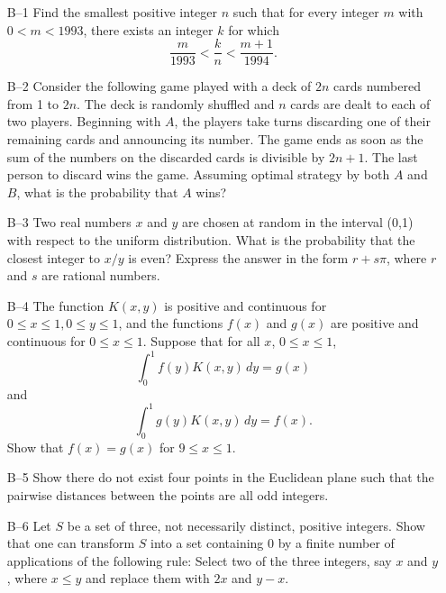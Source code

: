 \documentclass[amssymb,twocolumn,pra,10pt,aps]{revtex4-1}
\begin{document}
\begin{itemize}
\item[B--1]
Find the smallest positive integer $n$ such that for every integer $m$
with $0 < m < 1993$, there exists an integer $k$ for which
\[
\frac{m}{1993} < \frac{k}{n} < \frac{m+1}{1994}.
\]

\item[B--2]
Consider the following game played with a deck of $2n$ cards numbered
from 1 to $2n$. The deck is randomly shuffled and $n$ cards are dealt to
each of two players. Beginning with $A$, the players take turns
discarding one of their remaining cards and announcing its number. The
game ends as soon as the sum of the numbers on the discarded cards is
divisible by $2n+1$. The last person to discard wins the game. Assuming
optimal strategy by both $A$ and $B$, what is the probability that $A$ wins?

\item[B--3]
Two real numbers $x$ and $y$ are chosen at random in the interval (0,1)
with respect to the uniform distribution. What is the probability that
the closest integer to $x/y$ is even? Express the answer in the form
$r+s\pi$, where $r$ and $s$ are rational numbers.

\item[B--4]
The function $K(x,y)$ is positive and continuous for $0 \leq x \leq 1, 0
\leq y \leq 1$, and the functions $f(x)$ and $g(x)$ are positive and
continuous for $0 \leq x \leq 1$. Suppose that for all $x$, $0 \leq x \leq 1$,
\[
\int_0^1 f(y)K(x,y)\,dy = g(x)
\]
and
\[
\int_0^1 g(y)K(x,y)\,dy = f(x).
\]
Show that $f(x) = g(x)$ for $9 \leq x \leq 1$.

\item[B--5]
Show there do not exist four points in the Euclidean plane such that the
pairwise distances between the points are all odd integers.

\item[B--6]
Let $S$ be a set of three, not necessarily distinct, positive integers.
Show that one can transform $S$ into a set containing 0 by a finite
number of applications of the following rule: Select two of the three
integers, say $x$ and $y$, where $x \leq y$ and replace them with $2x$ and $y-x$.

\end{itemize}
\end{document}
